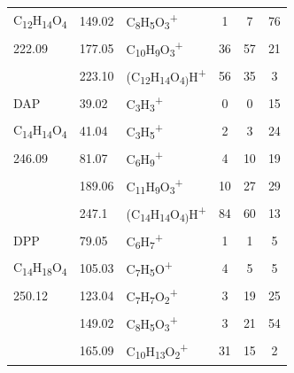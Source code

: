 {\begin{longtable}[c]{lllccc}
C\textsubscript{12}H\textsubscript{14}O\textsubscript{4}          & 149.02               & C\textsubscript{8}H\textsubscript{5}O\textsubscript{3}\textsuperscript{+}      & 1            & 7            & 76           \\
222.09          & 177.05               & C\textsubscript{10}H\textsubscript{9}O\textsubscript{3}\textsuperscript{+}     & 36           & 57           & 21           \\
          & 223.10                & (C\textsubscript{12}H\textsubscript{14}O\textsubscript{4)}H\textsuperscript{+} & 56           & 35           & 3            \\
\hline
DAP                                                      & 39.02  & C\textsubscript{3}H\textsubscript{3}\textsuperscript{+}                        & 0  & 0  & 15 \\
C\textsubscript{14}H\textsubscript{14}O\textsubscript{4} & 41.04  & C\textsubscript{3}H\textsubscript{5}\textsuperscript{+}                        & 2  & 3  & 24 \\
246.09                                                   & 81.07  & C\textsubscript{6}H\textsubscript{9}\textsuperscript{+}                        & 4  & 10 & 19 \\
                                                         & 189.06 & C\textsubscript{11}H\textsubscript{9}O\textsubscript{3}\textsuperscript{+}     & 10 & 27 & 29 \\
                                                         & 247.1  & (C\textsubscript{14}H\textsubscript{14}O\textsubscript{4)}H\textsuperscript{+} & 84 & 60 & 13\\
\hline
DPP       & 79.05                & C\textsubscript{6}H\textsubscript{7}\textsuperscript{+}                           & 1            & 1            & 5            \\
C\textsubscript{14}H\textsubscript{18}O\textsubscript{4}          & 105.03               & C\textsubscript{7}H\textsubscript{5}O\textsuperscript{+}                          & 4            & 5            & 5            \\
250.12          & 123.04               & C\textsubscript{7}H\textsubscript{7}O\textsubscript{2}\textsuperscript{+}      & 3            & 19           & 25           \\
          & 149.02               & C\textsubscript{8}H\textsubscript{5}O\textsubscript{3}\textsuperscript{+}      & 3            & 21           & 54           \\
          & 165.09               & C\textsubscript{10}H\textsubscript{13}O\textsubscript{2}\textsuperscript{+}    & 31           & 15           & 2            \\

\end{longtable}}
